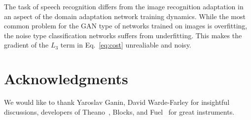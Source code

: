 \documentclass{article}
\begin{document}
    The task of speech recognition differs from the image recognition
    adaptation in an aspect of the domain adaptation network training dynamics. 
    While the most common problem for the GAN type of networks trained on images 
    is overfitting, the noise type classification networks suffers from 
    underfitting. This makes the gradient of the $L_3$ term in Eq.~\ref{eq:cost}
    unrealiable and noisy. 


\section*{Acknowledgments}

We would like to thank Yaroslav Ganin, David Warde-Farley for insightful discussions,
developers of Theano~\cite{2016arXiv160502688short}, Blocks, and Fuel~\cite{MerrienboerBDSW15} 
for great instruments.

%


\end{document}
